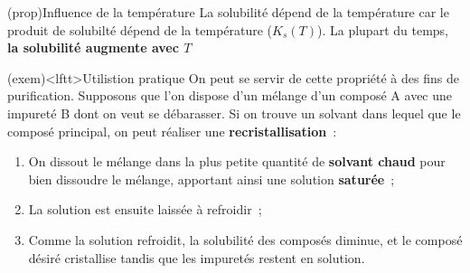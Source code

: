 \documentclass[../../main/main.tex]{subfiles}
\begin{document}
\begin{tcb*}(prop){Influence de la température}
	La solubilité dépend de la température car le produit de solubilté dépend de
	la température ($K_s(T)$). La plupart du temps, \textbf{la solubilité
		augmente avec $T$}
\end{tcb*}
\begin{tcb*}(exem)<lftt>{Utilistion pratique}
	On peut se servir de cette propriété à des fins de purification.
	Supposons que l'on dispose
	d'un mélange d'un composé A avec une impureté B dont on veut se débarasser. Si
	on trouve un solvant dans lequel  que le composé
	principal, on peut réaliser une \textbf{recristallisation}~:
	\begin{enumerate}
		\item On dissout le mélange
		      dans la plus petite quantité de \textbf{solvant chaud} pour bien dissoudre
		      le mélange, apportant ainsi une solution \textbf{saturée}~;
		\item La solution est ensuite laissée à refroidir~;
		\item Comme la solution refroidit, la solubilité des composés
		      diminue, et le composé désiré cristallise tandis que les impuretés restent en
		      solution.
	\end{enumerate}
\end{tcb*}
\end{document}
